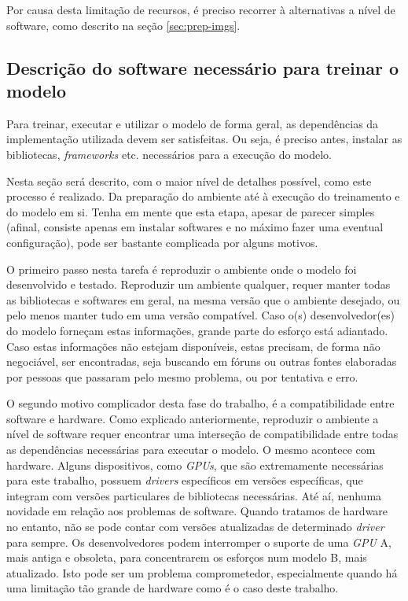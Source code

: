 Por causa desta limitação de recursos, é preciso recorrer à alternativas a nível de software, como descrito na seção \ref{sec:prep-imgs}.


\subsection{Descrição do software necessário para treinar o modelo}

Para treinar, executar e utilizar o modelo de forma geral, as dependências da implementação utilizada devem ser satisfeitas. Ou seja, é preciso antes, instalar as bibliotecas, \textit{frameworks} etc. necessários para a execução do modelo.

Nesta seção será descrito, com o maior nível de detalhes possível, como este processo é realizado. Da preparação do ambiente até à execução do treinamento e do modelo em si. Tenha em mente que esta etapa, apesar de parecer simples (afinal, consiste apenas em instalar softwares e no máximo fazer uma eventual configuração), pode ser bastante complicada por alguns motivos.

O primeiro passo nesta tarefa é reproduzir o ambiente onde o modelo foi desenvolvido e testado. Reproduzir um ambiente qualquer, requer manter todas as bibliotecas e softwares em geral, na mesma versão que o ambiente desejado, ou pelo menos manter tudo em uma versão compatível. Caso o(s) desenvolvedor(es) do modelo forneçam estas informações, grande parte do esforço está adiantado. Caso estas informações não estejam disponíveis, estas precisam, de forma não negociável, ser encontradas, seja buscando em fóruns ou outras fontes elaboradas por pessoas que passaram pelo mesmo problema, ou por tentativa e erro.

O segundo motivo complicador desta fase do trabalho, é a compatibilidade entre software e hardware. Como explicado anteriormente, reproduzir o ambiente a nível de software requer encontrar uma interseção de compatibilidade entre todas as dependências necessárias para executar o modelo. O mesmo acontece com hardware. Alguns dispositivos, como \textit{GPUs}, que são extremamente necessárias para este trabalho, possuem \textit{drivers} específicos em versões específicas, que integram com versões particulares de bibliotecas necessárias. Até aí, nenhuma novidade em relação aos problemas de software. Quando tratamos de hardware no entanto, não se pode contar com versões atualizadas de determinado \textit{driver} para sempre. Os desenvolvedores podem interromper o suporte de uma \textit{GPU} A, mais antiga e obsoleta, para concentrarem os esforços num modelo B, mais atualizado. Isto pode ser um problema comprometedor, especialmente quando há uma limitação tão grande de hardware como é o caso deste trabalho.

